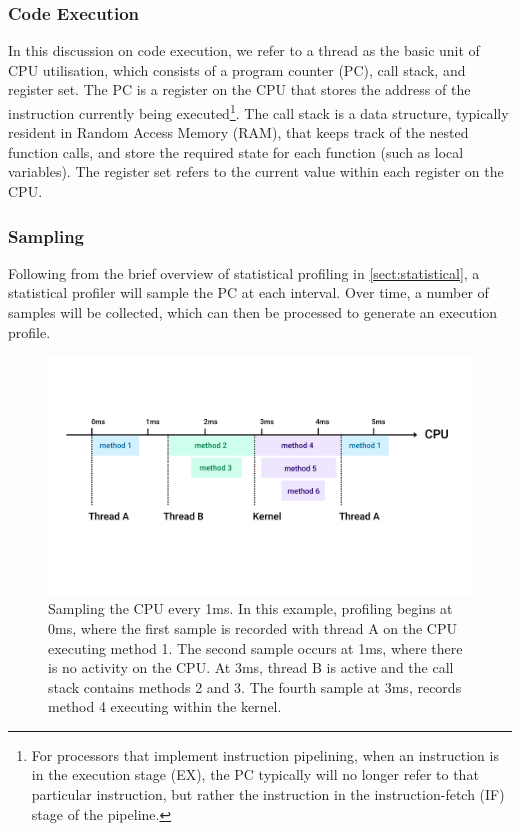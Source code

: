 \subsubsection{Code Execution}

In this discussion on code execution, we refer to a thread as the basic unit of CPU utilisation, which consists of a program counter (PC), call stack, and register set. The PC is a register on the CPU that stores the address of the instruction currently being executed\footnote{For processors that implement instruction pipelining, when an instruction is in the execution stage (EX), the PC typically will no longer refer to that particular instruction, but rather the instruction in the instruction-fetch (IF) stage of the pipeline.}. The call stack is a data structure, typically resident in Random Access Memory (RAM), that keeps track of the nested function calls, and store the required state for each function (such as local variables). The register set refers to the current value within each register on the CPU. 

\subsubsection{Sampling}

Following from the brief overview of statistical profiling in \ref{sect:statistical}, a statistical profiler will sample the PC at each interval. Over time, a number of samples will be collected, which can then be processed to generate an execution profile. 

\begin{figure}[h!]
    \includegraphics[width=\linewidth]{report-a_sampling_timeline}
    \caption{Sampling the CPU every 1ms. In this example, profiling begins at 0ms, where the first sample is recorded with thread A on the CPU executing method 1. The second sample occurs at 1ms, where there is no activity on the CPU. At 3ms, thread B is active and the call stack contains methods 2 and 3. The fourth sample at 3ms, records method 4 executing within the kernel. }
    \label{fig:sel4_microkernel}
\end{figure}

